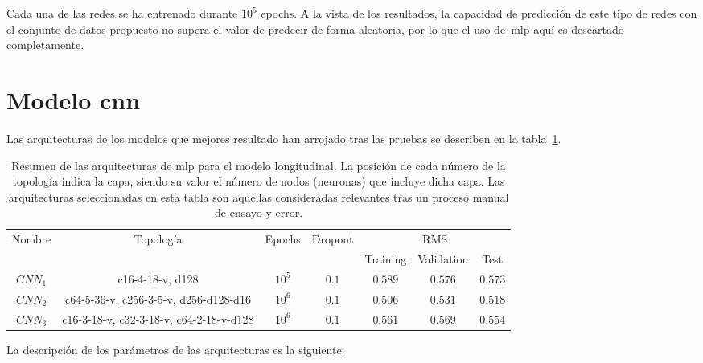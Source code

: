 Cada una de las redes se ha entrenado durante $10^5$ epochs. A la vista de los resultados, la capacidad de predicción de este tipo de redes con el conjunto de datos propuesto no supera el valor de predecir de forma aleatoria, por lo que el uso de~\ac{mlp} aquí es descartado completamente.

\section{Modelo \ac{cnn}}

Las arquitecturas de los modelos que mejores resultado han arrojado tras las pruebas se describen en la tabla~\ref{tbl:lc-cnn-architectures}.

\begin{table}[b]
	\centering
	\small
	\caption[Resumen de las arquitecturas \ac{mlp} para el modelo longitudinal]{Resumen de las arquitecturas de \ac{mlp} para el modelo longitudinal. La posición de cada número de la topología indica la capa, siendo su valor el número de nodos (neuronas) que incluye dicha capa. Las arquitecturas seleccionadas en esta tabla son aquellas consideradas relevantes tras un proceso manual de ensayo y error.}
	\label{tbl:lc-cnn-architectures}
	\begin{tabular}{ccccccc}
		\hline
		\multirow{2}{*}{Nombre} & \multirow{2}{*}{Topología} & \multirow{2}{*}{Epochs} & \multirow{2}{*}{Dropout} & \multicolumn{3}{c}{RMS}      \\
		&                            &                         &                          & Training & Validation & Test \\ \hline
		$CNN_1$ & c16-4-18-v, d128                        & $10^5$ & $0.1$ & $0.589$ & $0.576$ & $0.573$ \\
		$CNN_2$ & c64-5-36-v, c256-3-5-v, d256-d128-d16   & $10^6$ & $0.1$ & $0.506$ & $0.531$ & $0.518$ \\
		$CNN_3$ & c16-3-18-v, c32-3-18-v, c64-2-18-v-d128 & $10^6$ & $0.1$ & $0.561$ & $0.569$ & $0.554$ \\ \hline
	\end{tabular}
\end{table}

La descripción de los parámetros de las arquitecturas es la siguiente:

